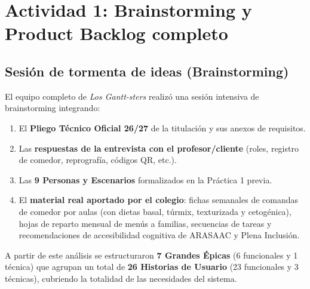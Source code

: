 \documentclass[11pt,a4paper]{article}
\begin{document}
\section{Actividad 1: Brainstorming y Product Backlog completo}
\subsection{Sesión de tormenta de ideas (Brainstorming)}
El equipo completo de \textit{Los Gantt-sters} realizó una sesión intensiva de brainstorming integrando:

\begin{enumerate}[leftmargin=1.6em,itemsep=2pt]
\item El \textbf{Pliego Técnico Oficial 26/27} de la titulación y sus anexos de requisitos.
\item Las \textbf{respuestas de la entrevista con el profesor/cliente} (roles, registro de comedor, reprografía, códigos QR, etc.).
\item Las \textbf{9 Personas y Escenarios} formalizados en la Práctica 1 previa.
\item El \textbf{material real aportado por el colegio}: fichas semanales de comandas de comedor por aulas (con dietas basal, túrmix, texturizada y cetogénica), hojas de reparto mensual de menús a familias, secuencias de tareas y recomendaciones de accesibilidad cognitiva de ARASAAC y Plena Inclusión.
\end{enumerate}

A partir de este análisis se estructuraron \textbf{7 Grandes Épicas} (6 funcionales y 1 técnica) que agrupan un total de \textbf{26 Historias de Usuario} (23 funcionales y 3 técnicas), cubriendo la totalidad de las necesidades del sistema.
\end{document}
